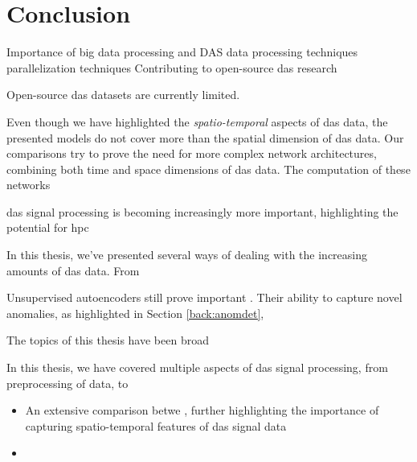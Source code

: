 \section{Conclusion}

Importance of big data processing and DAS data processing techniques
parallelization techniques 
Contributing to open-source das research

Open-source \acrshort{das} datasets are currently limited. 


Even though we have highlighted the \textit{spatio-temporal} aspects of \acrshort{das} data, the presented models do not cover more than the spatial dimension of \acrshort{das} data. Our comparisons try to prove the need for more complex network architectures, combining both time and space dimensions of \acrshort{das} data. The computation of these networks 



\acrshort{das} signal processing is becoming increasingly more important, highlighting the potential for \acrshort{hpc}

In this thesis, we've presented several ways of dealing with the increasing amounts of \acrshort{das} data. From 

Unsupervised autoencoders still prove important  . Their ability to capture novel anomalies, as highlighted in Section \ref{back:anomdet}, 



The topics of this thesis have been broad 

In this thesis, we have covered multiple aspects of \acrshort{das} signal processing, from preprocessing of data, to

\begin{itemize}
    \item An extensive comparison betwe , further highlighting the importance of capturing spatio-temporal features of \acrshort{das} signal data
    \item 
\end{itemize}


